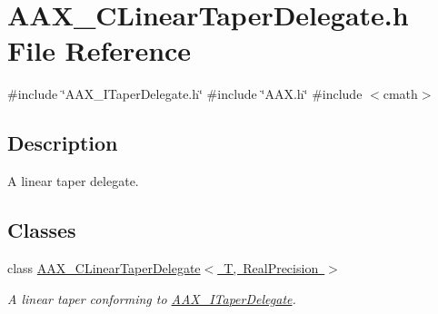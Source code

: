 \hypertarget{a00437}{}\section{A\+A\+X\+\_\+\+C\+Linear\+Taper\+Delegate.\+h File Reference}
\label{a00437}
{\ttfamily \#include \char`\"{}A\+A\+X\+\_\+\+I\+Taper\+Delegate.\+h\char`\"{}}\newline
{\ttfamily \#include \char`\"{}A\+A\+X.\+h\char`\"{}}\newline
{\ttfamily \#include $<$cmath$>$}\newline


\subsection{Description}
A linear taper delegate. 

\subsection*{Classes}
\begin{DoxyCompactItemize}
\item 
class \mbox{\hyperlink{a01493}{A\+A\+X\+\_\+\+C\+Linear\+Taper\+Delegate$<$ T, Real\+Precision $>$}}
\begin{DoxyCompactList}\small\item\em A linear taper conforming to \mbox{\hyperlink{a01881}{A\+A\+X\+\_\+\+I\+Taper\+Delegate}}. \end{DoxyCompactList}\end{DoxyCompactItemize}
